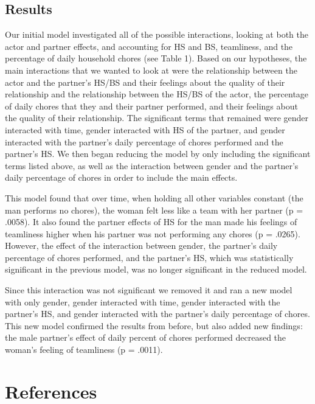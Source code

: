 \documentclass[
  man]{apa6}
\begin{document}
\hypertarget{results-1}{%
\subsection{Results}\label{results-1}}

Our initial model investigated all of the possible interactions, looking at both the actor and partner effects, and accounting for HS and BS, teamliness, and the percentage of daily household chores (see Table 1). Based on our hypotheses, the main interactions that we wanted to look at were the relationship between the actor and the partner's HS/BS and their feelings about the quality of their relationship and the relationship between the HS/BS of the actor, the percentage of daily chores that they and their partner performed, and their feelings about the quality of their relationship. The significant terms that remained were gender interacted with time, gender interacted with HS of the partner, and gender interacted with the partner's daily percentage of chores performed and the partner's HS. We then began reducing the model by only including the significant terms listed above, as well as the interaction between gender and the partner's daily percentage of chores in order to include the main effects.

This model found that over time, when holding all other variables constant (the man performs no chores), the woman felt less like a team with her partner (p = .0058). It also found the partner effects of HS for the man made his feelings of teamliness higher when his partner was not performing any chores (p = .0265). However, the effect of the interaction between gender, the partner's daily percentage of chores performed, and the partner's HS, which was statistically significant in the previous model, was no longer significant in the reduced model.

Since this interaction was not significant we removed it and ran a new model with only gender, gender interacted with time, gender interacted with the partner's HS, and gender interacted with the partner's daily percentage of chores. This new model confirmed the results from before, but also added new findings: the male partner's effect of daily percent of chores performed decreased the woman's feeling of teamliness (p = .0011).

\newpage

\hypertarget{references}{%
\section{References}\label{references}}
\end{document}

